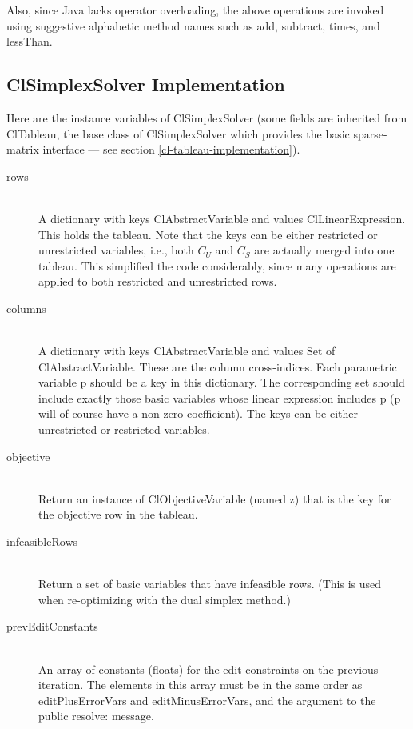 \documentclass{article}
\begin{document}
Also, since Java lacks operator overloading, the above operations are
invoked using suggestive alphabetic method names such as {\sf add}, {\sf
  subtract}, {\sf times}, and {\sf lessThan}.


\subsection{{\sf ClSimplexSolver} Implementation}
\label{cl-simplex-solver-implementation}

Here are the instance variables of {\sf ClSimplexSolver} (some fields
are inherited from {\sf ClTableau}, the base class of {\sf
  ClSimplexSolver} which provides the basic sparse-matrix interface ---
see section \ref{cl-tableau-implementation}).

\begin{description}

\item[{\sf rows}] \ \\
A dictionary with keys {\sf ClAbstractVariable} and
values {\sf ClLinearExpression}.  This holds the tableau.  Note that the
keys can be either restricted or unrestricted variables, i.e., both $C_U$
and $C_S$ are actually merged into one tableau.  This simplified the code
considerably, since many operations are applied to both restricted and
unrestricted rows.

\item[{\sf columns}] \ \\
A dictionary with keys {\sf ClAbstractVariable} and
values {\sf Set of ClAbstractVariable}.  These are the column
cross-indices.  Each parametric variable {\sf p} should be a key in this
dictionary.  The corresponding set should include exactly those basic
variables whose linear expression includes {\sf p}
({\sf p} will of course have a non-zero coefficient).  The keys can be 
either unrestricted or restricted variables.

\item[{\sf objective}] \ \\
Return an instance of {\sf ClObjectiveVariable}
(named {\sf z}) that is the key for the objective row in the tableau.

\item[{\sf infeasibleRows}] \ \\
Return a set of basic variables that have
infeasible rows.  (This is used when re-optimizing with the dual simplex
method.)  

\item[{\sf prevEditConstants}] \ \\
An array of constants (floats) for the edit
constraints on the previous iteration.  The elements in this array must be
in the same order as {\sf editPlusErrorVars} and {\sf editMinusErrorVars},
and the argument to the public {\sf resolve:} message.


\end{description}
\end{document}
